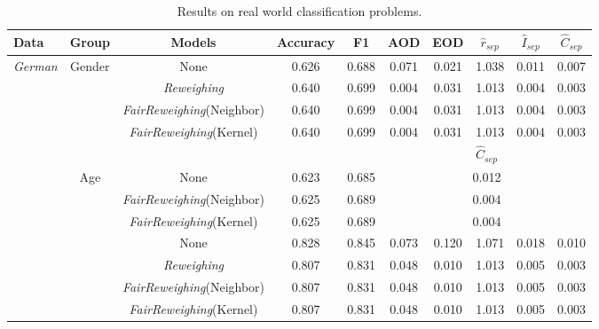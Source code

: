 \begin{table}[ht]
\small
  \setlength\tabcolsep{4pt}
  \setlength\extrarowheight{2pt}
  \caption{Results on real world classification problems.}
  \label{tab:classification}
  \begin{center}
  \begin{tabular}{l|c|c|c|c|c|c|c|c|c}
  \hline Data & Group & {Models} & Accuracy & F1 &AOD & EOD&  $\hat{r}_{sep}$ &$\hat{I}_{sep}$ & $\hat{C}_{sep}$\\ \hline
  
  \multirow{9}{*}{\emph{German}} & \multirow{4}{*}{Gender} & {None} & 0.626
 & 0.688 & 0.071 & 0.021 & 1.038 & 0.011 & 0.007 \\ 
  
  & & {\emph{Reweighing}} & 0.640 & 0.699 & 0.004 &0.031& 1.013 & 0.004 & 0.003 \\
  
  & & {\emph{FairReweighing}(Neighbor)} & 0.640 & 0.699 & 0.004 &0.031& 1.013 & 0.004 & 0.003  \\
  
   & & {\emph{FairReweighing}(Kernel)} & 0.640 & 0.699 & 0.004 &0.031& 1.013 & 0.004 & 0.003 \\ \cline{2-10}
   
   &\multicolumn{4}{c|}{}& \multicolumn{5}{c}{$\hat{C}_{sep}$}\\ \cline{2-10}
   
 & \multirow{4}{*}{Age} & {None} & 0.623
 
 & 0.685 & \multicolumn{5}{c}{0.012} \\ 
  
  
  & & {\emph{FairReweighing}(Neighbor)} & 0.625 & 0.689 & \multicolumn{5}{c}{0.004}\\
  
   & & {\emph{FairReweighing}(Kernel)} & 0.625 & 0.689 & \multicolumn{5}{c}{0.004}\\ \hline
  
  \multirow{9}{*}{\emph{Heart}} & \multirow{4}{*}{Gender} & {None} & 0.828  & 0.845 & 0.073 & 0.120 &1.071 & 0.018 & 0.010 \\ 
  
  & & {\emph{Reweighing}} & 0.807 & 0.831 & 0.048 & 0.010 & 1.013  & 0.005 & 0.003 \\ 
  
  & & {\emph{FairReweighing}(Neighbor)} & 0.807 & 0.831 & 0.048 & 0.010 & 1.013  & 0.005 & 0.003 \\
  
  & & {\emph{FairReweighing}(Kernel)} & 0.807 & 0.831 & 0.048 & 0.010 & 1.013  & 0.005 & 0.003 \\ \cline{2-10}
  

\end{tabular}
\end{center}
\end{table}
